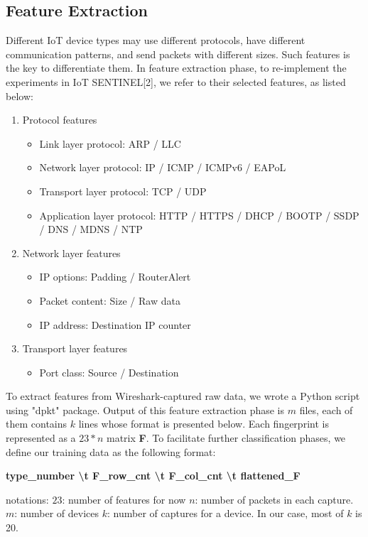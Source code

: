 \documentclass[twocolumn,10pt]{article}
\begin{document}
\subsection{Feature Extraction}
Different IoT device types may use different protocols, have different communication patterns, and send packets with different sizes. Such features is the key to differentiate them. In feature extraction phase, to re-implement the experiments in IoT SENTINEL[2], we refer to their selected features, as listed below:
\begin{enumerate}
  \item Protocol features
  \begin{itemize}
  \item Link layer protocol: ARP / LLC
  \item Network layer protocol: IP / ICMP / ICMPv6 / EAPoL
  \item Transport layer protocol: TCP / UDP
  \item Application layer protocol: HTTP / HTTPS / DHCP / BOOTP / SSDP / DNS / MDNS / NTP
  \end{itemize}
  \item Network layer features
  \begin{itemize}
  \item IP options: Padding / RouterAlert
  \item Packet content:  Size / Raw data
  \item IP address: Destination IP counter 
  \end{itemize}
  \item Transport layer features
  \begin{itemize}
  \item Port class: Source / Destination 
  \end{itemize}
\end{enumerate}

To extract features from Wireshark-captured raw data, we wrote a Python script using "dpkt" package. Output of this feature extraction phase is $m$ files, each of them contains $k$ lines whose format is presented below. Each fingerprint is represented as a $23*n$ matrix {\bf F}. To facilitate further classification phases, we define our training data as the following format:

{\bf type\_number \textbackslash t F\_row\_cnt \textbackslash t F\_col\_cnt \textbackslash t flattened\_F}

notations:
\newline $23$: number of features for now
\newline $n$: number of packets in each capture. 
\newline $m$: number of devices
\newline $k$: number of captures for a device. In our case, most of $k$ is 20.
\end{document}
